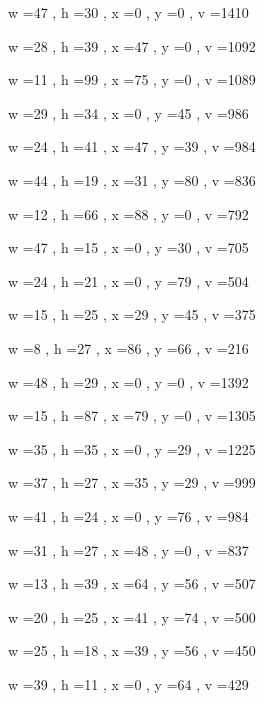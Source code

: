 \documentclass[11pt]{article}
\begin{document}
w =47 , h =30 , x =0 , y =0 , v =1410
\par
w =28 , h =39 , x =47 , y =0 , v =1092
\par
w =11 , h =99 , x =75 , y =0 , v =1089
\par
w =29 , h =34 , x =0 , y =45 , v =986
\par
w =24 , h =41 , x =47 , y =39 , v =984
\par
w =44 , h =19 , x =31 , y =80 , v =836
\par
w =12 , h =66 , x =88 , y =0 , v =792
\par
w =47 , h =15 , x =0 , y =30 , v =705
\par
w =24 , h =21 , x =0 , y =79 , v =504
\par
w =15 , h =25 , x =29 , y =45 , v =375
\par
w =8 , h =27 , x =86 , y =66 , v =216
\par
\newpage




w =48 , h =29 , x =0 , y =0 , v =1392
\par
w =15 , h =87 , x =79 , y =0 , v =1305
\par
w =35 , h =35 , x =0 , y =29 , v =1225
\par
w =37 , h =27 , x =35 , y =29 , v =999
\par
w =41 , h =24 , x =0 , y =76 , v =984
\par
w =31 , h =27 , x =48 , y =0 , v =837
\par
w =13 , h =39 , x =64 , y =56 , v =507
\par
w =20 , h =25 , x =41 , y =74 , v =500
\par
w =25 , h =18 , x =39 , y =56 , v =450
\par
w =39 , h =11 , x =0 , y =64 , v =429
\par
\newpage
\end{document}
